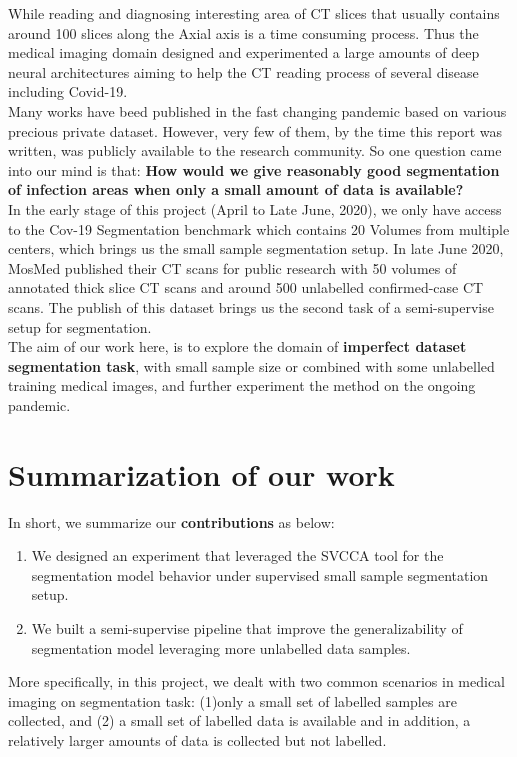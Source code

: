 While reading and diagnosing interesting area of CT slices that usually contains around 100 slices along the Axial axis is a time consuming process. Thus the medical imaging domain designed and experimented a large amounts of deep neural architectures aiming to help the CT reading process of several disease including Covid-19.\\

Many works have beed published in the fast changing pandemic based on various precious private dataset. However, very few of them, by the time this report was written, was publicly available to the research community. So one question came into our mind is that: \textbf{How would we give reasonably good segmentation of infection areas when only a small amount of data is available?}\\

In the early stage of this project (April to Late June, 2020), we only have access to the Cov-19 Segmentation benchmark which contains 20 Volumes from multiple centers, which brings us the small sample segmentation setup. In late June 2020, MosMed published their CT scans for public research with 50 volumes of annotated thick slice CT scans and around 500 unlabelled confirmed-case CT scans. The publish of this dataset brings us the second task of a semi-supervise setup for segmentation.\\

The aim of our work here, is to explore the domain of \textbf{imperfect dataset segmentation task}, with small sample size or combined with some unlabelled training medical images, and further experiment the method on the ongoing pandemic.

\section{Summarization of our work}
In short, we summarize our \textbf{contributions} as below:
\begin{enumerate}
	\item We designed an experiment that leveraged the SVCCA tool for the segmentation model behavior under supervised small sample segmentation setup.
	\item We built a semi-supervise pipeline that improve the generalizability of segmentation model leveraging more unlabelled data samples.
\end{enumerate}

More specifically, in this project, we dealt with two common scenarios in medical imaging on segmentation task: (1)only a small set of labelled samples are collected, and (2) a small set of labelled data is available and in addition, a relatively larger amounts of data is collected but not labelled.\\

